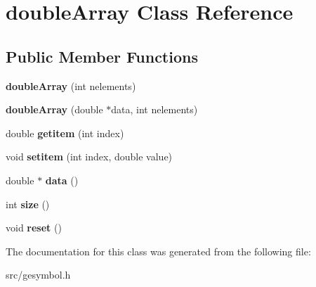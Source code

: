 \hypertarget{classdouble_array}{}\section{double\+Array Class Reference}
\label{classdouble_array}
\subsection*{Public Member Functions}
\begin{DoxyCompactItemize}
\item 
\mbox{\label{classdouble_array_aa40eb5b0c0018edca62079e9507a5fa0}} 
{\bfseries double\+Array} (int nelements)
\item 
\mbox{\label{classdouble_array_a18879df91e103b27f5359c5db6b2a78b}} 
{\bfseries double\+Array} (double $\ast$data, int nelements)
\item 
\mbox{\label{classdouble_array_a4a1cc96d05dc346d9017f29cf41f1def}} 
double {\bfseries getitem} (int index)
\item 
\mbox{\label{classdouble_array_a6feb7610fffe884308bac4a73ba64a27}} 
void {\bfseries setitem} (int index, double value)
\item 
\mbox{\label{classdouble_array_a758781789df7ca1b6dcaf8ee6866faf6}} 
double $\ast$ {\bfseries data} ()
\item 
\mbox{\label{classdouble_array_a0ac48fa266b19b1344e48497239b0b40}} 
int {\bfseries size} ()
\item 
\mbox{\label{classdouble_array_a7a46458c00ff94c87dad5b0a97d5110b}} 
void {\bfseries reset} ()
\end{DoxyCompactItemize}


The documentation for this class was generated from the following file\+:\begin{DoxyCompactItemize}
\item 
src/gesymbol.\+h\end{DoxyCompactItemize}
